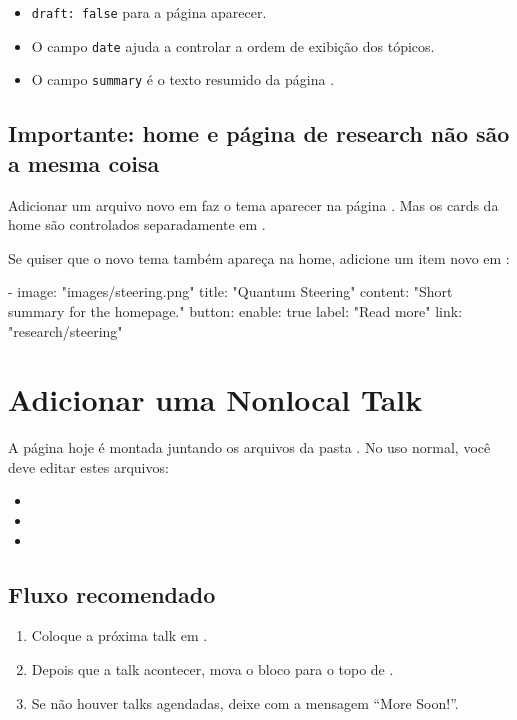 \documentclass[11pt,a4paper]{article}
\begin{document}
\begin{itemize}
  \item \texttt{draft: false} para a página aparecer.
  \item O campo \texttt{date} ajuda a controlar a ordem de exibição dos tópicos.
  \item O campo \texttt{summary} é o texto resumido da página .
\end{itemize}

\subsection{Importante: home e página de research não são a mesma coisa}

Adicionar um arquivo novo em  faz o tema aparecer na página
. Mas os cards da home são controlados separadamente em
.

Se quiser que o novo tema também apareça na home, adicione um item novo em :

\begin{terminal}
- image: "images/steering.png"
  title: "Quantum Steering"
  content: "Short summary for the homepage."
  button:
    enable: true
    label: "Read more"
    link: "research/steering"
\end{terminal}

\section{Adicionar uma Nonlocal Talk}

A página  hoje é montada juntando os arquivos da pasta .
No uso normal, você deve editar estes arquivos:

\begin{itemize}
  \item {}
  \item {}
  \item {}
\end{itemize}

\subsection{Fluxo recomendado}

\begin{enumerate}
  \item Coloque a próxima talk em .
  \item Depois que a talk acontecer, mova o bloco para o topo de .
  \item Se não houver talks agendadas, deixe  com a mensagem ``More Soon!''.
\end{enumerate}
\end{document}
